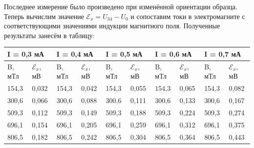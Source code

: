 \documentclass[a4paper,12pt]{article}
\begin{document}
Последнее измерение было произведено при изменённой ориентации образца. Теперь вычислим значение $ \mathcal{E}_x = U_{34} - U_0 $ и сопоставим токи в электромагните с соответствующими значениями индукции магнитного поля. Полученные результаты занесём в таблицу:

\begin{table}[!ht]
\begin{tabular}{|ll|ll|ll|ll|ll|}
\hline
\multicolumn{2}{|l|}{I = 0,3 мА}                  & \multicolumn{2}{l|}{I = 0,4 мА}                  & \multicolumn{2}{l|}{I = 0,5 мА}                  & \multicolumn{2}{l|}{I = 0,6 мА}                  & \multicolumn{2}{l|}{I = 0,7 мА}                  \\ \hline
\multicolumn{1}{|l|}{B, мТл} & $\mathcal{E}_x$, мВ & \multicolumn{1}{l|}{B, мТл} & $\mathcal{E}_x$, мВ & \multicolumn{1}{l|}{B, мТл} & $\mathcal{E}_x$, мВ & \multicolumn{1}{l|}{B, мТл} & $\mathcal{E}_x$, мВ & \multicolumn{1}{l|}{B, мТл} & $\mathcal{E}_x$, мВ \\ \hline
\multicolumn{1}{|l|}{154,3}  & 0,032               & \multicolumn{1}{l|}{154,3}  & 0,042               & \multicolumn{1}{l|}{154,3}  & 0,055               & \multicolumn{1}{l|}{154,3}  & 0,065               & \multicolumn{1}{l|}{154,3}  & 0,082               \\ \hline
\multicolumn{1}{|l|}{300,6}  & 0,066               & \multicolumn{1}{l|}{300,6}  & 0,088               & \multicolumn{1}{l|}{300,6}  & 0,111               & \multicolumn{1}{l|}{300,6}  & 0,133               & \multicolumn{1}{l|}{300,6}  & 0,167               \\ \hline
\multicolumn{1}{|l|}{509,3}  & 0,112               & \multicolumn{1}{l|}{509,3}  & 0,149               & \multicolumn{1}{l|}{509,3}  & 0,188               & \multicolumn{1}{l|}{509,3}  & 0,224               & \multicolumn{1}{l|}{509,3}  & 0,274               \\ \hline
\multicolumn{1}{|l|}{696,1}  & 0,154               & \multicolumn{1}{l|}{696,1}  & 0,205               & \multicolumn{1}{l|}{696,1}  & 0,259               & \multicolumn{1}{l|}{696,1}  & 0,312               & \multicolumn{1}{l|}{696,1}  & 0,375               \\ \hline
\multicolumn{1}{|l|}{806,5}  & 0,182               & \multicolumn{1}{l|}{806,5}  & 0,242               & \multicolumn{1}{l|}{806,5}  & 0,304               & \multicolumn{1}{l|}{806,5}  & 0,364               & \multicolumn{1}{l|}{806,5}  & 0,443               \\ \hline

\end{tabular}
\end{table}
\end{document}
